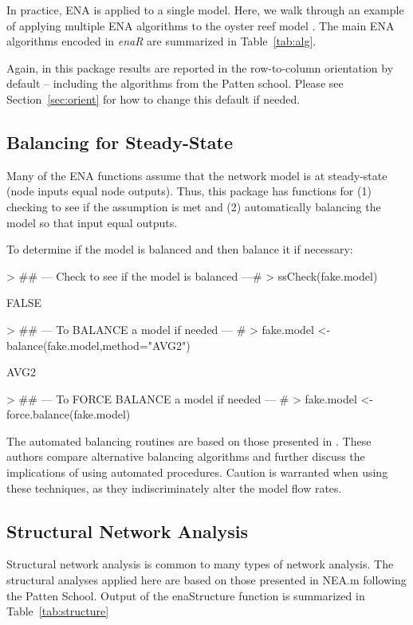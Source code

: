 \documentclass[article]{jss}
\begin{document}
In practice, ENA is applied to a single model.  Here, we walk through an
example of applying multiple ENA algorithms to the oyster reef model
\citep{dame81}.  The main ENA algorithms encoded in \textit{enaR} are
summarized in Table~\ref{tab:alg}.

Again, in this package results are reported in the row-to-column
orientation by default -- including the algorithms from the Patten
school.  Please see Section~\ref{sec:orient} for how to change this
default if needed.

\subsection{Balancing for Steady-State}

Many of the ENA functions assume that the network model is at
steady-state (node inputs equal node outputs).  Thus, this package has
functions for (1) checking to see if the assumption is met and (2)
automatically balancing the model so that input equal outputs.

To determine if the model is balanced and then balance it if necessary:
\begin{Schunk}
\begin{Sinput}
> ## --- Check to see if the model is balanced ---#
> ssCheck(fake.model)
\end{Sinput}
\begin{Soutput}
[1] FALSE
\end{Soutput}
\begin{Sinput}
> ## --- To BALANCE a model if needed --- #
> fake.model <- balance(fake.model,method="AVG2")
\end{Sinput}
\begin{Soutput}
[1] AVG2
\end{Soutput}
\begin{Sinput}
> ## --- To FORCE BALANCE a model if needed --- #
> fake.model <- force.balance(fake.model)
\end{Sinput}
\end{Schunk}

The automated balancing routines are based on those presented in
\citet{allesina03}.  These authors compare alternative balancing
algorithms and further discuss the implications of using automated
procedures.  Caution is warranted when using these techniques, as they
indiscriminately alter the model flow rates.


\subsection{Structural Network Analysis}
Structural network analysis is common to many types of network
analysis.  The structural analyses applied here are based on those
presented in NEA.m \citep{fath06} following the Patten School.  Output
of the enaStructure function is summarized in Table~\ref{tab:structure}
\end{document}
